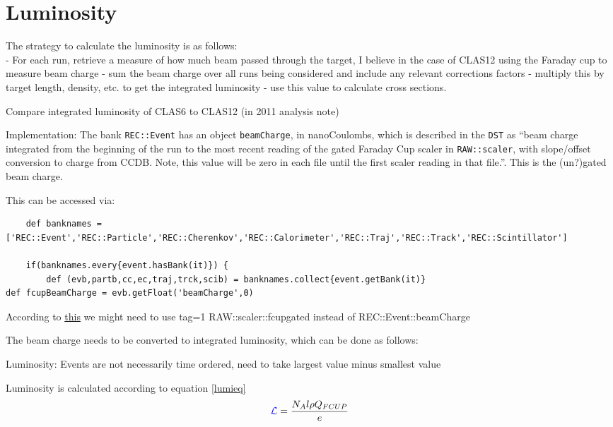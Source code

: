 \section{Luminosity} \label{sec:luminosity}

The strategy to calculate the luminosity is as follows:\\

 - For each run, retrieve a measure of how much beam passed through the target, I believe in the case of CLAS12 using the Faraday cup to measure beam charge
    - sum the beam charge over all runs being considered and include any relevant corrections factors
    - multiply this by target length, density, etc. to get the integrated luminosity
    - use this value to calculate cross sections.


Compare integrated luminosity of CLAS6 to CLAS12 (in 2011 analysis note)


Implementation:
The bank \texttt{REC::Event} has an object \texttt{beamCharge}, in nanoCoulombs, which is described in the \texttt{DST} as ``beam charge integrated from the beginning of the run to the most recent reading of the gated Faraday Cup scaler in \texttt{RAW::scaler}, with slope/offset conversion to charge from CCDB. Note, this value will be zero in each file until the first scaler reading in that file.''. This is the (un?)gated beam charge. 



This can be accessed via:

\begin{lstlisting}
	def banknames = ['REC::Event','REC::Particle','REC::Cherenkov','REC::Calorimeter','REC::Traj','REC::Track','REC::Scintillator']

	if(banknames.every{event.hasBank(it)}) {
		def (evb,partb,cc,ec,traj,trck,scib) = banknames.collect{event.getBank(it)}
def fcupBeamCharge = evb.getFloat('beamCharge',0)
\end{lstlisting}

    According to \href{https://clas12.discourse.group/t/accessing-beam-charge-information/239}{this} we might need to use tag=1 RAW::scaler::fcupgated instead of REC::Event::beamCharge
    

The beam charge needs to be converted to integrated luminosity, which can be done as follows:

Luminosity: Events are not necessarily time ordered, need to take largest value minus smallest value  


Luminosity is calculated according to equation \ref{lumieq}
 \begin{equation}\label{lumieq}
            \textcolor{blue}{ \mathcal{L}} = \frac{N_A l \rho Q_{FCUP}}{e}
\end{equation}

